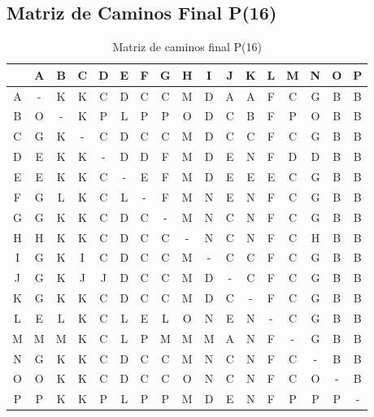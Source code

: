 \documentclass[12pt]{article}
\begin{document}
\clearpage
\subsection{Matriz de Caminos Final P(16)}
\begin{table}[h!]
\centering
\begin{tabular}{|c|c|c|c|c|c|c|c|c|c|c|c|c|c|c|c|c|}
\hline
 & A & B & C & D & E & F & G & H & I & J & K & L & M & N & O & P \\\hline
A & - & K & K & C & D & C & C & M & D & A & A & F & C & G & B & B \\\hline
B & O & - & K & P & L & P & P & O & D & C & B & F & P & O & B & B \\\hline
C & G & K & - & C & D & C & C & M & D & C & C & F & C & G & B & B \\\hline
D & E & K & K & - & D & D & F & M & D & E & N & F & D & D & B & B \\\hline
E & E & K & K & C & - & E & F & M & D & E & E & E & C & G & B & B \\\hline
F & G & L & K & C & L & - & F & M & N & E & N & F & C & G & B & B \\\hline
G & G & K & K & C & D & C & - & M & N & C & N & F & C & G & B & B \\\hline
H & H & K & K & C & D & C & C & - & N & C & N & F & C & H & B & B \\\hline
I & G & K & I & C & D & C & C & M & - & C & C & F & C & G & B & B \\\hline
J & G & K & J & J & D & C & C & M & D & - & C & F & C & G & B & B \\\hline
K & G & K & K & C & D & C & C & M & D & C & - & F & C & G & B & B \\\hline
L & E & L & K & C & L & E & L & O & N & E & N & - & C & G & B & B \\\hline
M & M & M & K & C & L & P & M & M & M & A & N & F & - & G & B & B \\\hline
N & G & K & K & C & D & C & C & M & N & C & N & F & C & - & B & B \\\hline
O & O & K & K & C & D & C & C & O & N & C & N & F & C & O & - & B \\\hline
P & P & K & K & P & L & P & P & M & D & E & N & F & P & P & P & - \\\hline
\end{tabular}
\caption{Matriz de caminos final P(16)}
\end{table}

\clearpage
\end{document}
